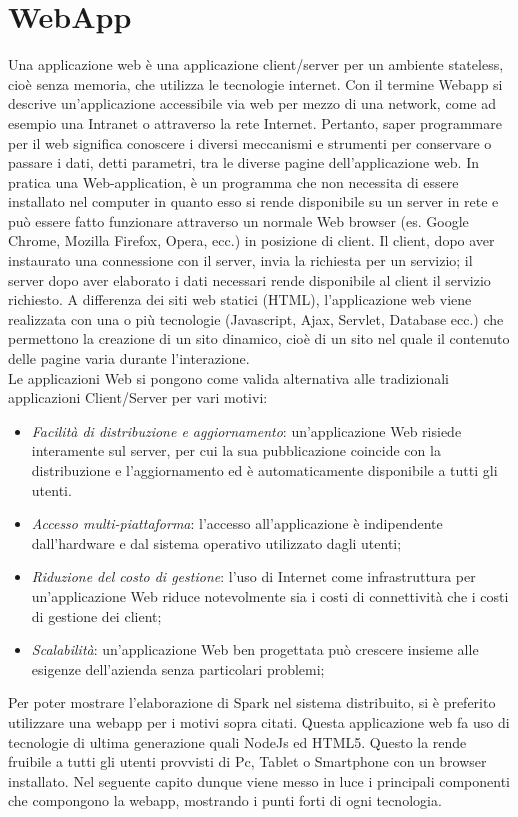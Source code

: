 \section{WebApp}
\label{sec:webapp}
Una applicazione web è una applicazione client/server per un ambiente stateless, cioè senza memoria, che utilizza le tecnologie internet. Con il termine Webapp si descrive un'applicazione accessibile via web per mezzo di una network, come ad esempio una Intranet o attraverso la rete Internet. Pertanto, saper programmare per il web significa conoscere i diversi meccanismi e strumenti per conservare o passare i dati, detti parametri, tra le diverse pagine dell'applicazione web. In pratica una Web-application, è un programma che non necessita di essere installato nel computer in quanto esso si rende disponibile su un server in rete e può essere fatto funzionare attraverso un normale Web browser (es. Google Chrome, Mozilla Firefox, Opera, ecc.) in posizione di client. Il client, dopo aver instaurato una connessione con il server, invia la richiesta per un servizio; il server dopo aver elaborato i dati necessari rende disponibile al client il servizio richiesto. A differenza dei siti web statici (HTML), l'applicazione web viene realizzata con una o più tecnologie (Javascript, Ajax, Servlet, Database ecc.) che permettono la creazione di un sito dinamico, cioè di un sito nel quale il contenuto delle pagine varia durante l'interazione.
\\Le applicazioni Web si pongono come valida alternativa alle tradizionali applicazioni Client/Server per vari motivi:
\begin{itemize}
\item \textit{Facilità di distribuzione e aggiornamento}: un'applicazione Web risiede interamente sul server, per cui la sua pubblicazione coincide con la distribuzione e l'aggiornamento ed è automaticamente disponibile a tutti gli utenti.
\item \textit{Accesso multi-piattaforma}: l'accesso all'applicazione è indipendente dall'hardware e dal sistema operativo utilizzato dagli utenti;
\item \textit{Riduzione del costo di gestione}: l'uso di Internet come infrastruttura per un'applicazione Web riduce notevolmente sia i costi di connettività che i costi di gestione dei client;
\item \textit{Scalabilità}: un'applicazione Web ben progettata può crescere insieme alle esigenze dell'azienda senza particolari problemi;
\end{itemize}
Per poter mostrare l'elaborazione di Spark nel sistema distribuito, si è preferito utilizzare una webapp per i motivi sopra citati. Questa applicazione web fa uso di tecnologie di ultima generazione quali NodeJs ed HTML5. Questo la rende fruibile a tutti gli utenti provvisti di Pc, Tablet o Smartphone con un browser installato. Nel seguente capito dunque viene messo in luce i principali componenti che compongono la webapp, mostrando i punti forti di ogni tecnologia.
